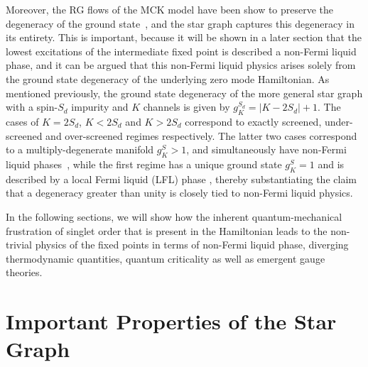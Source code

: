 \documentclass[reprint,prb,superscriptaddress]{revtex4-2}
\begin{document}
Moreover, the RG flows of the MCK model have been show to {preserve the degeneracy of the ground state}~\cite{pang_cox_1991,kroha_kolf_2007,zitko_fabrizio_2017}, and the star graph captures this degeneracy in its entirety.
This is important, because it will be shown in a later section that the lowest excitations of the intermediate fixed point is described a non-Fermi liquid phase, and it can be argued that this non-Fermi liquid physics arises solely from the ground state degeneracy of the underlying zero mode Hamiltonian.
As mentioned previously, the ground state degeneracy of the more general star graph with a spin-\({S_d}\) impurity and \(K\) channels is given by \(g^{S_d}_K = |K - 2{S_d}|+1\).
The cases of \(K=2{S_d}\), \(K<2{S_d}\) and \(K>2{S_d}\) correspond to exactly screened, under-screened and over-screened regimes respectively.
The latter two cases correspond to a multiply-degenerate manifold \(g^S_K > 1\), and simultaneously have non-Fermi liquid phases~\cite{Noz_blandin_1980,Gan_Andrei_Coleman_1993,emery_kivelson,Gan_mchannel_1994,Tsvelick_Weigmann_mchannel_1984,Tsvelick_weigmann_mchannel_1985,parcollet_olivier_large_N,kimura_taro_Su_N_kondo,PhysRevB.73.224445,cox_jarrell_two_channel_rev,affleck_1991_overscreen,Coleman_tsvelik,affleck1993exact,coleman_pepin_2003,roch_nicolas_costi_2009,schiller_avraham_2008,Durganandini_2011}, while the first regime has a unique ground state \(g^S_K = 1\) and is described by a local Fermi liquid (LFL) phase \cite{wilson1975,nozieres1974fermi,Noz_blandin_1980,andreiKondoreview,tsvelickKondoreview}, thereby substantiating the claim that a degeneracy greater than unity is closely tied to non-Fermi liquid physics.


In the following sections, we will show how the inherent quantum-mechanical frustration of singlet order that is present in the Hamiltonian leads to the non-trivial physics of the fixed points in terms of non-Fermi liquid phase, diverging thermodynamic quantities, quantum criticality as well as emergent gauge theories.
\section{Important Properties of the Star Graph}
\label{sec:props_star}
\end{document}
